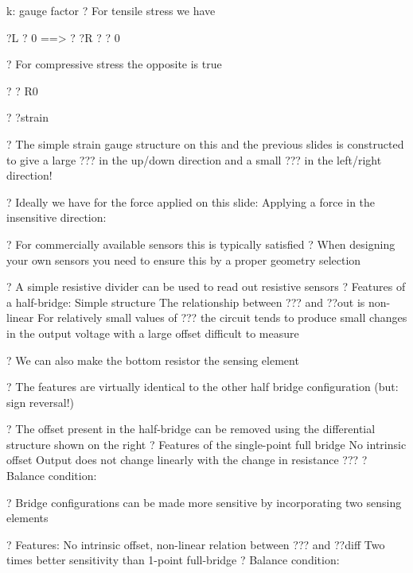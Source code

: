 \documentclass[2pt,landscape]{article}
\begin{document}
\begin{multicols*}{5}
k: gauge factor
?	For tensile stress we have



?L ? 0 ==> ? ?R ?	? 0





?	For compressive stress the opposite is true


?
? R0


?
?strain







?	The simple strain gauge structure on this and the previous slides is 
constructed to give a large ??? in the
up/down direction and a small ??? in 
the left/right direction!

?	Ideally we have for the force applied 
on this slide:
Applying a force in the insensitive direction:


?	For commercially available sensors 
this is typically satisfied
?	When designing your own sensors you 
need to ensure this by a proper 
geometry selection



?	A simple resistive divider can be used to read 
out resistive sensors
?	Features of a half-bridge:
\textbullet 	Simple structure
\textbullet 	The relationship between ??? and ??out is non-linear
\textbullet 	For relatively small values of ??? the circuit tends to produce small 
changes in the output voltage with a large offset	difficult to measure



?	We can also make the bottom resistor the 
sensing element

?	The features are virtually identical to the other 
half bridge configuration (but: sign reversal!)



?	The offset present in the half-bridge can be 
removed using the differential structure 
shown on the right
?	Features of the single-point full bridge
\textbullet 	No intrinsic offset
\textbullet 	Output does not change linearly with the change in resistance ???
?	Balance condition:




?	Bridge configurations can be made more 
sensitive by incorporating two sensing 
elements

?	Features:
\textbullet 	No intrinsic offset, non-linear relation between ??? and ??diff
\textbullet 	Two times better sensitivity than 1-point full-bridge
?	Balance condition:





\end{multicols*}
\end{document}
